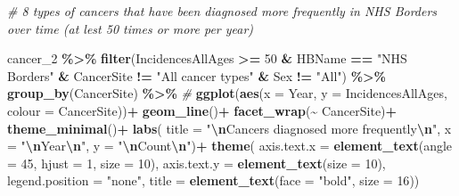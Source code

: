 \documentclass[
]{article}
\newenvironment{Shaded}{\begin{snugshade}}{\end{snugshade}}
\newcommand{\AttributeTok}[1]{\textcolor[rgb]{0.13,0.29,0.53}{#1}}
\newcommand{\CommentTok}[1]{\textcolor[rgb]{0.56,0.35,0.01}{\textit{#1}}}
\newcommand{\DecValTok}[1]{\textcolor[rgb]{0.00,0.00,0.81}{#1}}
\newcommand{\FunctionTok}[1]{\textcolor[rgb]{0.13,0.29,0.53}{\textbf{#1}}}
\newcommand{\NormalTok}[1]{#1}
\newcommand{\SpecialCharTok}[1]{\textcolor[rgb]{0.81,0.36,0.00}{\textbf{#1}}}
\newcommand{\StringTok}[1]{\textcolor[rgb]{0.31,0.60,0.02}{#1}}
\begin{document}
\begin{Shaded}
\begin{Highlighting}[]
\CommentTok{\# 8 types of cancers that have been diagnosed more frequently in NHS Borders over time (at lest 50 times or more per year)}

\NormalTok{cancer\_2 }\SpecialCharTok{\%\textgreater{}\%}  
  \FunctionTok{filter}\NormalTok{(IncidencesAllAges }\SpecialCharTok{\textgreater{}=} \DecValTok{50} \SpecialCharTok{\&}\NormalTok{ HBName }\SpecialCharTok{==} \StringTok{"NHS Borders"} \SpecialCharTok{\&}\NormalTok{ CancerSite }\SpecialCharTok{!=} \StringTok{"All cancer types"} \SpecialCharTok{\&}\NormalTok{ Sex }\SpecialCharTok{!=} \StringTok{"All"}\NormalTok{) }\SpecialCharTok{\%\textgreater{}\%}
  \FunctionTok{group\_by}\NormalTok{(CancerSite) }\SpecialCharTok{\%\textgreater{}\%} \CommentTok{\#}
  \FunctionTok{ggplot}\NormalTok{(}\FunctionTok{aes}\NormalTok{(}\AttributeTok{x =}\NormalTok{ Year, }\AttributeTok{y =}\NormalTok{ IncidencesAllAges, }\AttributeTok{colour =}\NormalTok{ CancerSite))}\SpecialCharTok{+}
  \FunctionTok{geom\_line}\NormalTok{()}\SpecialCharTok{+}
  \FunctionTok{facet\_wrap}\NormalTok{(}\SpecialCharTok{\textasciitilde{}}\NormalTok{ CancerSite)}\SpecialCharTok{+}
  \FunctionTok{theme\_minimal}\NormalTok{()}\SpecialCharTok{+}
  \FunctionTok{labs}\NormalTok{(}
    \AttributeTok{title =} \StringTok{"}\SpecialCharTok{\textbackslash{}n}\StringTok{Cancers diagnosed more frequently}\SpecialCharTok{\textbackslash{}n}\StringTok{"}\NormalTok{,}
    \AttributeTok{x =} \StringTok{"}\SpecialCharTok{\textbackslash{}n}\StringTok{Year}\SpecialCharTok{\textbackslash{}n}\StringTok{"}\NormalTok{, }
    \AttributeTok{y =} \StringTok{"}\SpecialCharTok{\textbackslash{}n}\StringTok{Count}\SpecialCharTok{\textbackslash{}n}\StringTok{"}\NormalTok{)}\SpecialCharTok{+}
  \FunctionTok{theme}\NormalTok{(}
    \AttributeTok{axis.text.x =} \FunctionTok{element\_text}\NormalTok{(}\AttributeTok{angle =} \DecValTok{45}\NormalTok{, }\AttributeTok{hjust =} \DecValTok{1}\NormalTok{, }\AttributeTok{size =} \DecValTok{10}\NormalTok{),}
  \AttributeTok{axis.text.y =} \FunctionTok{element\_text}\NormalTok{(}\AttributeTok{size =} \DecValTok{10}\NormalTok{),}
    \AttributeTok{legend.position =} \StringTok{"none"}\NormalTok{,}
    \AttributeTok{title =} \FunctionTok{element\_text}\NormalTok{(}\AttributeTok{face =} \StringTok{"bold"}\NormalTok{, }\AttributeTok{size =} \DecValTok{16}\NormalTok{))}
\end{Highlighting}
\end{Shaded}
\end{document}
